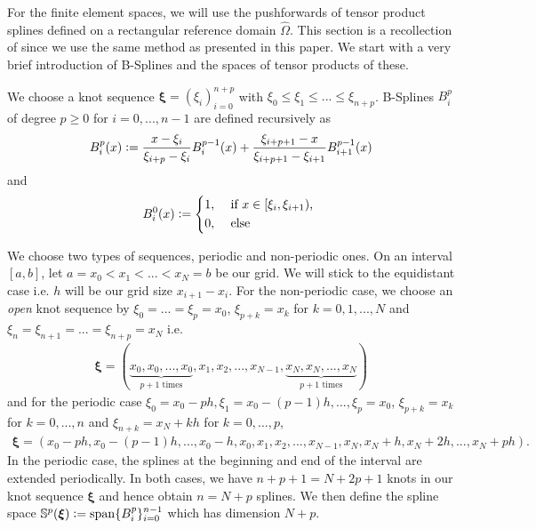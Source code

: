 \documentclass[../master_thesis.tex]{subfiles}
\begin{document}
For the finite element spaces, we will use the pushforwards of tensor product splines 
defined on a rectangular reference domain $\hat{\Omega}$. This section is a recollection 
of \cite[Sec. 4.2]{multipatch_paper} 
since we use the same method as presented in this paper.  
We start with a very brief introduction of B-Splines and the spaces of tensor products 
of these.

We choose a knot sequence $\bm{\xi} = (\xi_i )_{i=0}^{n+p}$ with 
$\xi_0 \leq \xi_1 \leq ... \leq \xi_{n+p}$. 
B-Splines $B^p_i$ of degree $p\geq 0$ for $i = 0,...,n-1$ are defined recursively as 
\begin{align*}
    B^p_{i}(x) \vcentcolon= \frac{x - \xi_i}{\xi_{i+p}- \xi_i} B_i^{p-1}(x) 
        + \frac{\xi_{i+p+1} - x}{\xi_{i+p+1}- \xi_{i+1}} B_{i+1}^{p-1}(x) 
\end{align*}
and 
\begin{align*}
    B^0_i(x) \vcentcolon= \begin{cases*}
        1, & \text{ if $x \in [\xi_i,\xi_{i+1})$},
        \\0, & \text{ else}
    \end{cases*}
\end{align*}

We choose two types of sequences, periodic and non-periodic ones.
On an interval $[a,b]$, 
let $a= x_0 < x_1 < ... < x_N = b$ be our grid. 
We will stick to the equidistant case i.e. $h$ will be our grid size 
$x_{i+1} - x_i$.
For the non-periodic case, we choose an \textit{open} knot sequence by 
$\xi_0 = ... = \xi_p = x_0$, $\xi_{p+k} = x_k$ for $k = 0,1,...,N$ and 
$\xi_{n} = \xi_{n+1} = ... = \xi_{n+p} = x_N$ i.e. 
\begin{align*}
    \bm{\xi} = (\underbrace{x_0, x_0,...,x_0}_{\text{$p+1$ times}}, x_1, x_2, ..., x_{N-1}, 
        \underbrace{x_N, x_N, ..., x_N}_{\text{$p+1$ times}})   
\end{align*}
and for the periodic case 
$\xi_0 = x_0-ph, \xi_1 = x_0-(p-1)h, ..., \xi_p = x_0$, 
$\xi_{p+k} = x_k$ for $k=0,..., n$ and $\xi_{n+k} = x_N + kh$ for $k = 0, ..., p$, 
\begin{align*}
    \bm{\xi} = (x_0-ph,x_0-(p-1)h,...,x_0-h, x_0,  x_1, x_2, ..., x_{N-1}, 
        x_N, x_N + h, x_N + 2h, ..., x_N + ph ).
\end{align*}
In the periodic case, the splines at the beginning and end of the interval are extended periodically.
In both cases, we have $n + p +1 = N+2p+1$ knots in our knot sequence $\bm{\xi}$ and
hence obtain $n = N + p$ splines.
We then define the spline space $\mathbb{S}^p(\bm{\xi}) \vcentcolon= \operatorname{span} \{ B_i^p \}_{i=0}^{n-1}$
which has dimension $N+p$.
\end{document}
